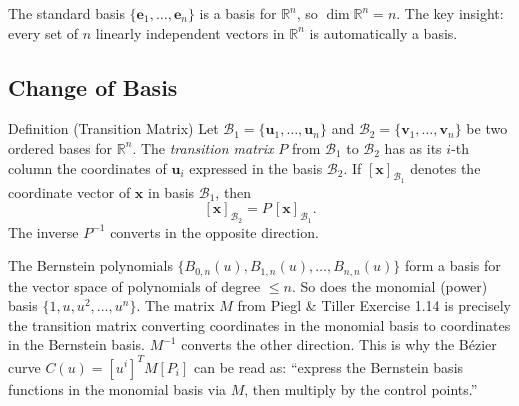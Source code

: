 \begin{remark*}
The standard basis $\{\mathbf{e}_1, \ldots, \mathbf{e}_n\}$ is a basis for $\mathbb{R}^n$,
so $\dim \mathbb{R}^n = n$.
The key insight: every set of $n$ linearly independent vectors in $\mathbb{R}^n$ is
automatically a basis.
\end{remark*}

\subsection*{Change of Basis}

\begin{propositionbox}{Definition (Transition Matrix)}
Let $\mathcal{B}_1 = \{\mathbf{u}_1, \ldots, \mathbf{u}_n\}$ and
$\mathcal{B}_2 = \{\mathbf{v}_1, \ldots, \mathbf{v}_n\}$ be two ordered bases for $\mathbb{R}^n$.
The \emph{transition matrix} $P$ from $\mathcal{B}_1$ to $\mathcal{B}_2$ has
as its $i$-th column the coordinates of $\mathbf{u}_i$ expressed in the basis $\mathcal{B}_2$.
If $[\mathbf{x}]_{\mathcal{B}_1}$ denotes the coordinate vector of $\mathbf{x}$ in basis $\mathcal{B}_1$, then
\[
  [\mathbf{x}]_{\mathcal{B}_2} = P \,[\mathbf{x}]_{\mathcal{B}_1}.
\]
The inverse $P^{-1}$ converts in the opposite direction.
\end{propositionbox}

\begin{remark*}
The Bernstein polynomials $\{B_{0,n}(u), B_{1,n}(u), \ldots, B_{n,n}(u)\}$ form a
basis for the vector space of polynomials of degree $\leq n$.
So does the monomial (power) basis $\{1, u, u^2, \ldots, u^n\}$.
The matrix $M$ from Piegl \& Tiller Exercise 1.14 is precisely the transition
matrix converting coordinates in the monomial basis to coordinates in the Bernstein basis.
$M^{-1}$ converts the other direction.
This is why the B\'{e}zier curve $C(u) = [u^i]^T M [P_i]$ can be read as:
``express the Bernstein basis functions in the monomial basis via $M$, then
multiply by the control points.''
\end{remark*}
